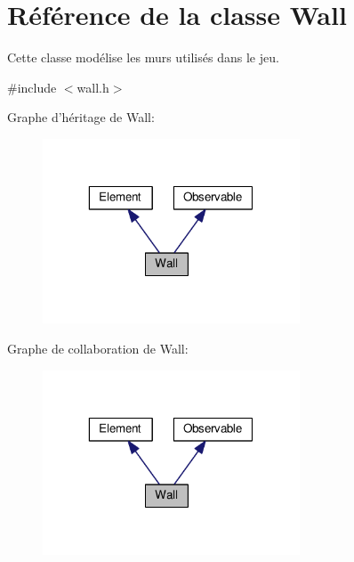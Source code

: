 \hypertarget{classWall}{\section{Référence de la classe Wall}
\label{classWall}
}


Cette classe modélise les murs utilisés dans le jeu.  




{\ttfamily \#include $<$wall.\+h$>$}



Graphe d'héritage de Wall\+:\nopagebreak
\begin{figure}[H]
\begin{center}
\leavevmode
\includegraphics[width=217pt]{de/d28/classWall__inherit__graph}
\end{center}
\end{figure}


Graphe de collaboration de Wall\+:\nopagebreak
\begin{figure}[H]
\begin{center}
\leavevmode
\includegraphics[width=217pt]{d9/d82/classWall__coll__graph}
\end{center}
\end{figure}
